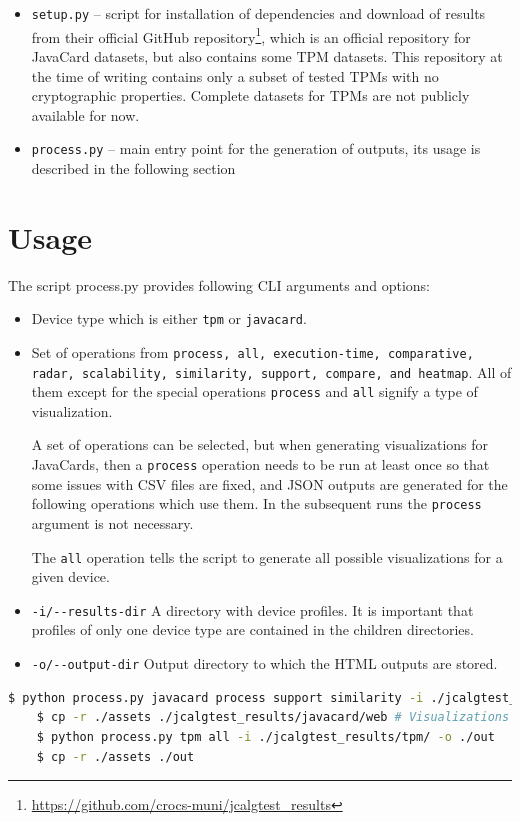 \begin{itemize}
    \item \texttt{setup.py} -- script for installation of dependencies and download of results from their official GitHub repository\footnote{\url{https://github.com/crocs-muni/jcalgtest_results}}, which is an official repository for JavaCard datasets, but also contains some TPM datasets. This repository at the time of writing contains only a subset of tested TPMs with no cryptographic properties. Complete datasets for TPMs are not publicly available for now. 
    \item \texttt{process.py} -- main entry point for the generation of outputs, its usage is described in the following section
\end{itemize}

\section{Usage}
The script process.py provides following CLI arguments and options:

\begin{itemize}
    \item Device type which is either \texttt{tpm} or \texttt{javacard}.
    \item Set of operations from \texttt{process, all, execution-time, comparative, radar, scalability, similarity, support, compare, and heatmap}. All of them except for the special operations \texttt{process} and \texttt{all} signify a type of visualization.
    
    A set of operations can be selected, but when generating visualizations for JavaCards, then a \texttt{process} operation needs to be run at least once so that some issues with CSV files are fixed, and JSON outputs are generated for the following operations which use them. In the subsequent runs the \texttt{process} argument is not necessary.
    
    The \texttt{all} operation tells the script to generate all possible visualizations for a given device.
    \item \texttt{-i/-{}-results-dir} A directory with device profiles. It is important that profiles of only one device type are contained in the children directories.
    \item \texttt{-o/-{}-output-dir} Output directory to which the HTML outputs are stored. 
\end{itemize}

\begin{lstlisting}[language=bash]
    $ python process.py javacard process support similarity -i ./jcalgtest_results/javacard/ -o ./jcalgtest_results/javacard/web
    $ cp -r ./assets ./jcalgtest_results/javacard/web # Visualizations need assets folder
    $ python process.py tpm all -i ./jcalgtest_results/tpm/ -o ./out
    $ cp -r ./assets ./out
\end{lstlisting}

